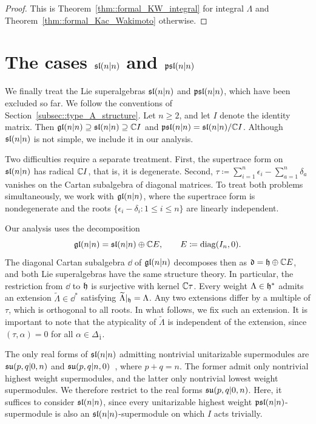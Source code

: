 \begin{proof}
This is Theorem~\ref{thm::formal_KW_integral} for integral $\Lambda$ and Theorem~\ref{thm::formal_Kac_Wakimoto} otherwise.
\end{proof}



\section{The cases \texorpdfstring{$\sl(n\vert n)$ and $\psl(n\vert n)$}{sl(n|n) and psl(n|n)}}
\label{sec::equal_rank_type_A}
\noindent
We finally treat the Lie superalgebras $\sl(n\vert n)$ and $\psl(n\vert n)$, which have been excluded so far. We follow the conventions of Section~\ref{subsec::type_A_structure}. Let $n\geq2$, and let $I$ denote the identity matrix. Then $\gl(n\vert n)\supseteq\sl(n\vert n)\supseteq\CC I$ and $\psl(n\vert n)=\sl(n\vert n)/\CC I$. Although $\sl(n\vert n)$ is not simple, we include it in our analysis.

Two difficulties require a separate treatment. First, the supertrace form on $\sl(n\vert n)$ has radical $\CC I$, that is, it is degenerate. Second, $\tau\coloneqq\sum_{i=1}^n\epsilon_i-\sum_{a=1}^n\delta_a$ vanishes on the Cartan subalgebra of diagonal matrices. To treat both problems simultaneously, we work with $\gl(n\vert n)$, where the supertrace form is nondegenerate and the roots $\{\epsilon_{i}-\delta_{i} : 1\leq i \leq n\}$ are linearly independent. 

Our analysis uses the decomposition
\begin{equation}
\gl(n\vert n)=\sl(n\vert n)\oplus\CC E,\qquad E\coloneqq\diag(I_n,0).
\end{equation}
The diagonal Cartan subalgebra $\dd$ of $\gl(n\vert n)$ decomposes then as $\dd=\hh\oplus\CC E$, and both Lie superalgebras have the same structure theory. In particular, the restriction from $\dd$ to $\hh$ is surjective with kernel $\CC\tau$. Every weight $\Lambda\in\hh^\ast$ admits an extension $\widetilde\Lambda\in\dd^\ast$ satisfying $\widetilde\Lambda|_\hh=\Lambda$. Any two extensions differ by a multiple of $\tau$, which is orthogonal to all roots. In what follows, we fix such an extension. It is important to note that the atypicality of $\widetilde{\Lambda}$ is independent of the extension, since $(\tau,\alpha)=0$ for all $\alpha \in \Delta_{\bar{1}}$.

The only real forms of $\sl(n\vert n)$ admitting nontrivial unitarizable supermodules are $\su(p,q\vert 0,n)$ and $\su(p,q\vert n,0)$~\cite{Schmidt,neeb2011lie}, where $p+q=n$. The former admit only nontrivial highest weight supermodules, and the latter only nontrivial lowest weight supermodules. We therefore restrict to the real forms $\su(p,q\vert 0,n)$. Here, it suffices to consider $\sl(n\vert n)$, since every unitarizable highest weight $\psl(n\vert n)$-supermodule is also an $\sl(n\vert n)$-supermodule on which $I$ acts trivially.


